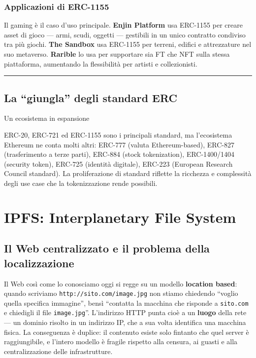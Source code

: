 \documentclass[
  italian,
  openany]{book}
\begin{document}
\subsubsection{Applicazioni di ERC-1155}\label{applicazioni-di-erc-1155}

Il gaming è il caso d'uso principale. \textbf{Enjin Platform} usa
ERC-1155 per creare asset di gioco --- armi, scudi, oggetti ---
gestibili in un unico contratto condiviso tra più giochi. \textbf{The
Sandbox} usa ERC-1155 per terreni, edifici e attrezzature nel suo
metaverso. \textbf{Rarible} lo usa per supportare sia FT che NFT sulla
stessa piattaforma, aumentando la flessibilità per artisti e
collezionisti.

\begin{center}\rule{0.5\linewidth}{0.5pt}\end{center}

\subsection{La ``giungla'' degli standard
ERC}\label{la-giungla-degli-standard-erc}

\begin{calloutnote}{Un ecosistema in espansione}

ERC-20, ERC-721 ed ERC-1155 sono i principali standard, ma l'ecosistema
Ethereum ne conta molti altri: ERC-777 (valuta Ethereum-based), ERC-827
(trasferimento a terze parti), ERC-884 (stock tokenization),
ERC-1400/1404 (security token), ERC-725 (identità digitale), ERC-223
(European Research Council standard). La proliferazione di standard
riflette la ricchezza e complessità degli use case che la tokenizzazione
rende possibili.

\end{calloutnote}

\section{IPFS: Interplanetary File
System}\label{ipfs-interplanetary-file-system}

\subsection{Il Web centralizzato e il problema della
localizzazione}\label{il-web-centralizzato-e-il-problema-della-localizzazione}

Il Web così come lo conosciamo oggi si regge su un modello
\textbf{location based}: quando scriviamo
\texttt{http://sito.com/image.jpg} non stiamo chiedendo ``voglio quella
specifica immagine'', bensì ``contatta la macchina che risponde a
\texttt{sito.com} e chiedigli il file \texttt{image.jpg}''. L'indirizzo
HTTP punta cioè a un \textbf{luogo} della rete --- un dominio risolto in
un indirizzo IP, che a sua volta identifica una macchina fisica. La
conseguenza è duplice: il contenuto esiste solo fintanto che quel server
è raggiungibile, e l'intero modello è fragile rispetto alla censura, ai
guasti e alla centralizzazione delle infrastrutture.
\end{document}
